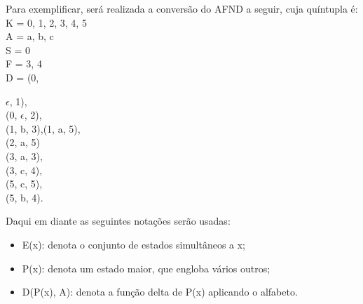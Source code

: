 \documentclass[a4paper,10pt]{article} %
\begin{document}
Para exemplificar, será realizada a conversão do AFND a seguir, cuja quíntupla é:\\K = {0, 1, 2, 3, 4, 5}\\A = {a, b, c}\\S = {0}\\F = {3, 4}\\D = (0, {$\epsilon$, 1),\\(0, {$\epsilon$}, 2),\\(1, b, 3),(1, a, 5),\\(2, a, 5)\\(3, a, 3),\\(3, c, 4),\\(5, c, 5),\\(5, b, 4). \\
    \begin{center}
    \end{center}

Daqui em diante as seguintes notações serão usadas:
    \begin{itemize}
        \item E(x): denota o conjunto de estados simultâneos a x;
        \item P(x): denota um estado maior, que engloba vários outros;
        \item D(P(x), A): denota a função delta de P(x) aplicando o alfabeto.
    \end{itemize}
    
}
\end{document}
